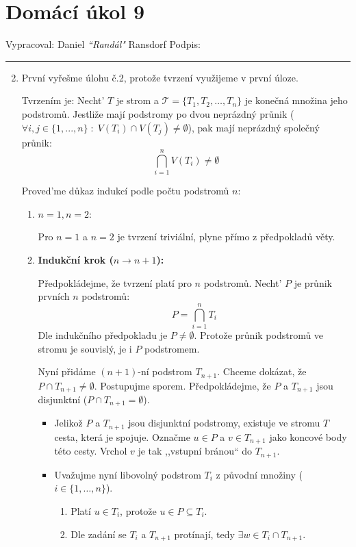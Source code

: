 \documentclass[12pt]{article}
\begin{document}
\section*{Domácí úkol 9}

Vypracoval: Daniel \textit{``Randál"} Ransdorf \hfill Podpis: \rule{4cm}{0.4pt}

\begin{enumerate}
  
  \setcounter{enumi}{1}
  \item První vyřešme úlohu č.2, protože tvrzení využijeme v první úloze.

    Tvrzením je: Necht' $T$ je strom a $\mathcal{T} = \{T_1, T_2, \dots, T_n\}$ je konečná množina jeho podstromů. Jestliže mají podstromy po dvou neprázdný průnik ($\forall i,j \in \{1,...,n\} \;:\; V(T_i) \cap V(T_j) \neq \emptyset$), pak mají neprázdný společný průnik:
    $$ \bigcap_{i=1}^n V(T_i) \neq \emptyset $$

    Proved'me důkaz indukcí podle počtu podstromů $n$:

    \begin{enumerate}
      \item $n=1, n=2$:

      Pro $n=1$ a $n=2$ je tvrzení triviální, plyne přímo z předpokladů věty.

      \item \textbf{Indukční krok ($n \to n+1$):}

      Předpokládejme, že tvrzení platí pro $n$ podstromů. Necht' $P$ je průnik prvních $n$ podstromů:
      $$ P = \bigcap_{i=1}^n T_i $$
      Dle indukčního předpokladu je $P \neq \emptyset$. Protože průnik podstromů ve stromu je souvislý, je i $P$ podstromem.

      Nyní přidáme $(n+1)$-ní podstrom $T_{n+1}$. Chceme dokázat, že $P \cap T_{n+1} \neq \emptyset$.
      Postupujme sporem. Předpokládejme, že $P$ a $T_{n+1}$ jsou disjunktní ($P \cap T_{n+1} = \emptyset$).

      \begin{itemize}
          \item Jelikož $P$ a $T_{n+1}$ jsou disjunktní podstromy, existuje ve stromu $T$ cesta, která je spojuje. 
            Označme $u \in P$ a $v \in T_{n+1}$ jako koncové body této cesty. Vrchol $v$ je tak ,,vstupní bránou`` do $T_{n+1}$.

          \item Uvažujme nyní libovolný podstrom $T_i$ z původní množiny ($i \in \{1, \dots, n\}$).
          \begin{enumerate}
              \item Platí $u \in T_i$, protože $u \in P \subseteq T_i$.
              \item Dle zadání se $T_i$ a $T_{n+1}$ protínají, tedy $\exists w \in T_i \cap T_{n+1}$.
          \end{enumerate}
          

\end{itemize}
\end{enumerate}
\end{enumerate}
\end{document}
